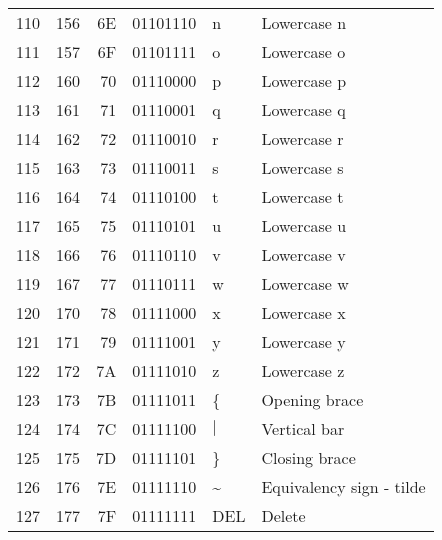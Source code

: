 \documentclass[11pt]{article}
\begin{document}
\begin{longtable}{rrrrll}
110 & 156 & 6E & 01101110 & n & Lowercase n\\[0pt]
111 & 157 & 6F & 01101111 & o & Lowercase o\\[0pt]
112 & 160 & 70 & 01110000 & p & Lowercase p\\[0pt]
113 & 161 & 71 & 01110001 & q & Lowercase q\\[0pt]
114 & 162 & 72 & 01110010 & r & Lowercase r\\[0pt]
115 & 163 & 73 & 01110011 & s & Lowercase s\\[0pt]
116 & 164 & 74 & 01110100 & t & Lowercase t\\[0pt]
117 & 165 & 75 & 01110101 & u & Lowercase u\\[0pt]
118 & 166 & 76 & 01110110 & v & Lowercase v\\[0pt]
119 & 167 & 77 & 01110111 & w & Lowercase w\\[0pt]
120 & 170 & 78 & 01111000 & x & Lowercase x\\[0pt]
121 & 171 & 79 & 01111001 & y & Lowercase y\\[0pt]
122 & 172 & 7A & 01111010 & z & Lowercase z\\[0pt]
123 & 173 & 7B & 01111011 & \{ & Opening brace\\[0pt]
124 & 174 & 7C & 01111100 & \(\vert{}\) & Vertical bar\\[0pt]
125 & 175 & 7D & 01111101 & \} & Closing brace\\[0pt]
126 & 176 & 7E & 01111110 & \textasciitilde{} & Equivalency sign - tilde\\[0pt]
127 & 177 & 7F & 01111111 & DEL & Delete\\[0pt]
\end{longtable}
\end{document}
